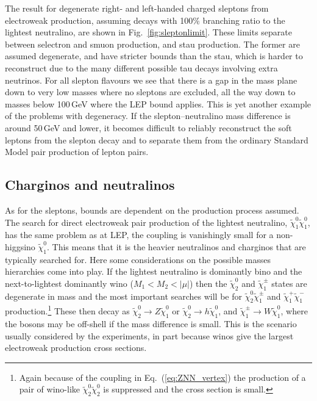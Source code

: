 \documentclass[notes.tex]{subfiles}
\begin{document}
The result for degenerate right- and left-handed charged sleptons from electroweak production, assuming decays with 100\% branching ratio to the lightest neutralino, are shown in Fig.~\ref{fig:sleptonlimit}. These limits separate between selectron and smuon production, and stau production. The former are assumed degenerate, and have stricter bounds than the stau, which is harder to reconstruct due to the many different possible tau decays involving extra neutrinos. For all slepton flavours we see that there is a gap in the mass plane down to very low masses where no sleptons are excluded, all the way down to masses below 100\,GeV where the LEP bound applies. This is yet another example of the problems with degeneracy. If the slepton--neutralino mass difference is around 50\,GeV and lower, it becomes difficult to reliably reconstruct the soft leptons from the slepton decay and to separate them from the ordinary Standard Model pair production of lepton pairs.


\subsection{Charginos and neutralinos}
As for the sleptons, bounds are dependent on the production process assumed. The search for direct electroweak pair production of the lightest neutralino, $\tilde{\chi}^0_1\tilde{\chi}^0_1$, has the same problem as at LEP, the coupling is vanishingly small for a non-higgsino $\tilde{\chi}^0_1$. This means that it is the heavier neutralinos and charginos that are typically searched for. Here some considerations on the possible masses hierarchies come into play. If the lightest neutralino is dominantly bino and the next-to-lightest dominantly wino ($M_1<M_2<|\mu|$) then the $\tilde{\chi}^0_2$ and $\tilde{\chi}^\pm_1$ states are degenerate in mass and the most important searches will be for $\tilde{\chi}^0_2\tilde{\chi}^\pm_1$ and $\tilde{\chi}^+_1\tilde{\chi}^-_1$ production.\footnote{Again because of the coupling in Eq.~(\ref{eq:ZNN_vertex}) the production of a pair of wino-like $\tilde{\chi}^0_2\tilde{\chi}^0_2$ is suppressed and the cross section is small.} These then decay as $\tilde{\chi}^0_2\to Z \tilde{\chi}^0_1$ or  $\tilde{\chi}^0_2\to h \tilde{\chi}^0_1$, and  $\tilde{\chi}^\pm_1\to W \tilde{\chi}^0_1$, where the bosons may be off-shell if the mass difference is small.
This is the scenario usually considered by the experiments, in part because winos give the largest electroweak production cross sections. 
\end{document}
